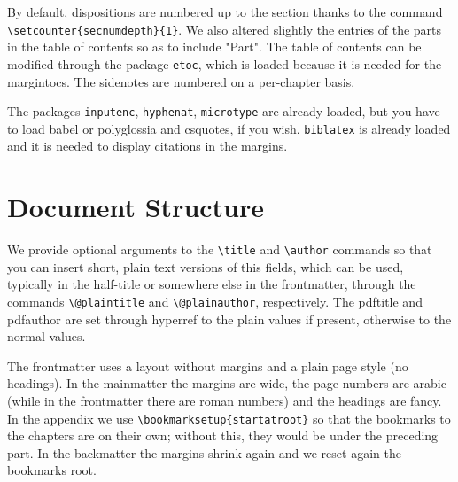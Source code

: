 By default, dispositions are numbered up to the section thanks to the 
command \verb|\setcounter{secnumdepth}{1}|. We also altered slightly the 
entries of the parts in the table of contents so as to include "Part". 
The table of contents can be modified through the package \verb|etoc|, 
which is loaded because it is needed for the margintocs. The sidenotes 
are numbered on a per-chapter basis.


The packages \verb|inputenc|, \verb|hyphenat|, \verb|microtype| are 
already loaded, but you have to load babel or polyglossia and csquotes, 
if you wish. \verb|biblatex| is already loaded and it is needed to 
display citations in the margins.

\section{Document Structure}

We provide optional arguments to the \verb|\title| and \verb|\author| 
commands so that you can insert short, plain text versions of this 
fields, which can be used, typically in the half-title or somewhere else 
in the frontmatter, through the commands \verb|\@plaintitle| and 
\verb|\@plainauthor|, respectively. The pdftitle and pdfauthor are set 
through hyperref to the plain values if present, otherwise to the normal 
values.

The frontmatter uses a layout without margins and a plain page style 
(\ie no headings). In the mainmatter the margins are wide, the page 
numbers are arabic (while in the frontmatter there are roman numbers) 
and the headings are fancy. In the appendix we use 
\verb|\bookmarksetup{startatroot}| so that the bookmarks to the chapters 
are on their own; without this, they would be under the preceding part. 
In the backmatter the margins shrink again and we reset again the 
bookmarks root.
